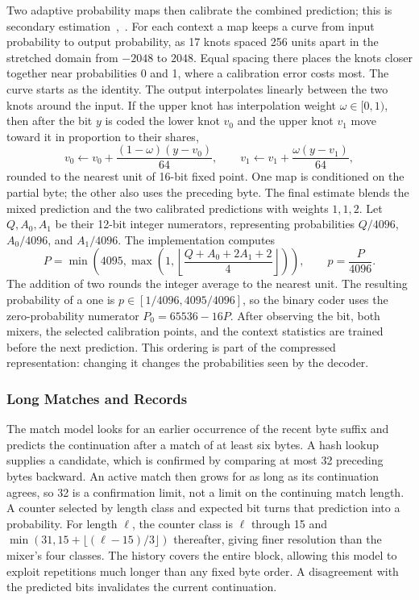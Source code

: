 \documentclass[10pt,letterpaper]{article}
\begin{document}
Two adaptive probability maps then calibrate the combined prediction; this is secondary estimation~\cite[Sec.~4.2]{mahoney},~\cite[Sec.~3.1]{knoll}. For each context a map keeps a curve from input probability to output probability, as 17 knots spaced 256 units apart in the stretched domain from $-2048$ to $2048$. Equal spacing there places the knots closer together near probabilities 0 and 1, where a calibration error costs most. The curve starts as the identity. The output interpolates linearly between the two knots around the input. If the upper knot has interpolation weight $\omega\in[0,1)$, then after the bit $y$ is coded the lower knot $v_0$ and the upper knot $v_1$ move toward it in proportion to their shares,
\begin{equation}
 v_0\leftarrow v_0+\frac{(1-\omega)(y-v_0)}{64},\qquad v_1\leftarrow v_1+\frac{\omega(y-v_1)}{64},
\end{equation}
rounded to the nearest unit of 16-bit fixed point. One map is conditioned on the partial byte; the other also uses the preceding byte. The final estimate blends the mixed prediction and the two calibrated predictions with weights $1,1,2$. Let $Q,A_0,A_1$ be their 12-bit integer numerators, representing probabilities $Q/4096$, $A_0/4096$, and $A_1/4096$. The implementation computes
\begin{equation}
 P=\min\!\left(4095,\max\!\left(1,\left\lfloor\frac{Q+A_0+2A_1+2}{4}\right\rfloor\right)\right),
 \qquad p=\frac{P}{4096}.
\end{equation}
The addition of two rounds the integer average to the nearest unit. The resulting probability of a one is $p\in[1/4096,4095/4096]$, so the binary coder uses the zero-probability numerator $P_0=65536-16P$. After observing the bit, both mixers, the selected calibration points, and the context statistics are trained before the next prediction. This ordering is part of the compressed representation: changing it changes the probabilities seen by the decoder.

\subsubsection{Long Matches and Records}
The match model looks for an earlier occurrence of the recent byte suffix and predicts the continuation after a match of at least six bytes. A hash lookup supplies a candidate, which is confirmed by comparing at most 32 preceding bytes backward. An active match then grows for as long as its continuation agrees, so 32 is a confirmation limit, not a limit on the continuing match length. A counter selected by length class and expected bit turns that prediction into a probability. For length $\ell$, the counter class is $\ell$ through 15 and $\min(31,15+\lfloor(\ell-15)/3\rfloor)$ thereafter, giving finer resolution than the mixer's four classes. The history covers the entire block, allowing this model to exploit repetitions much longer than any fixed byte order. A disagreement with the predicted bits invalidates the current continuation.
\end{document}
